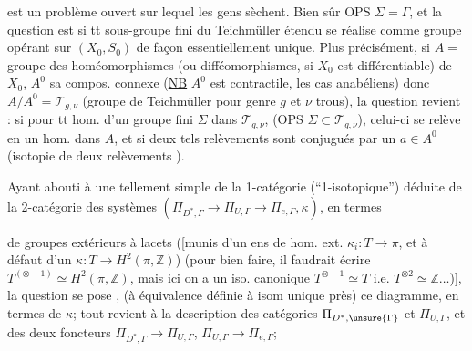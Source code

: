 est un problème ouvert sur lequel les
gens sèchent. Bien sûr OPS \(\Sigma=\Gamma\),
et la question est si tt sous-groupe
fini du Teichmüller étendu se
réalise comme groupe opérant sur \((X_0,S_0)\) 
de façon essentiellement unique. Plus
précisément, si  \(A=\) groupe des homéomorphismes
(ou difféomorphismes, si \(X_0\) est
différentiable) de \(X_0\), \(A^0\) sa compos. 
connexe (\uline{NB} \(A^0\) est contractile, \deleted{\unsure{)}}
les cas anabéliens) donc \(A/A^0=\mathcal T_{g,\nu}\)
(groupe de Teichmüller pour genre \(g\) et \(\nu\)
trous), la question revient :  si pour tt
hom. d'un groupe fini \(\Sigma\) dans  \(\mathcal T_{g,\nu}\),
(OPS \(\Sigma\subset\mathcal T_{g,\nu}\)), celui-ci se relève
en un hom. dans \(A\), et si deux tels
relèvements sont conjugués par un \(a\in A^0\)
(isotopie  de deux relèvements \unsure{\(\sim\)}).

Ayant abouti à une  tellement
simple de la 1-catégorie (``1-isotopique'') déduite
de la 2-catégorie des systèmes
\((\Pi_{D^*,\Gamma}\longrightarrow\Pi_{U,\Gamma}\longrightarrow\Pi_{e,\Gamma},\kappa)\), en termes

de groupes extérieurs à lacets (\inserted{\(\pi\)}[munis
d'un ens de hom. ext. \(\kappa_i:T\longrightarrow\pi\), et
à défaut d'un \(\kappa:T\longrightarrow H^2(\pi,\mathbb Z)\))
(pour bien faire, il faudrait écrire
\(T^{(\otimes-1)}\simeq H^2(\pi,\mathbb Z)\), mais ici on a un iso.
canonique \(T^{\otimes-1}\simeq T\) i.e. \(T^{\otimes 2}\simeq\mathbb Z\ldots\))],
la question se pose ,
(à équivalence définie à isom unique près)
ce diagramme, en termes de \(\kappa\); tout
revient à la  description des
catégories \(\Pi_{D^*,\unsure{\Gamma}}\) et \(\Pi_{U,\Gamma}\), et des deux
foncteurs \(\Pi_{D^*,\Gamma}\longrightarrow\Pi_{U,\Gamma}\), \(\Pi_{U,\Gamma}\longrightarrow\Pi_{e,\Gamma}\);

